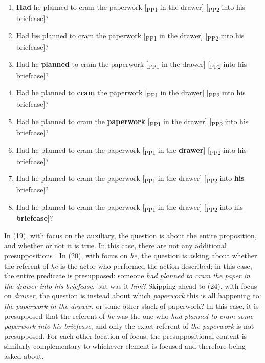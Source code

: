 \documentclass[12pt,oneside]{book}
\providecommand{\tightlist}{%
  \setlength{\itemsep}{0pt}\setlength{\parskip}{0pt}}
\begin{document}
\begin{enumerate}
\def\labelenumi{(\arabic{enumi})}
\setcounter{enumi}{18}
\tightlist
\item
  \textbf{Had} he planned to cram the paperwork {[}\textsubscript{PP1} in the drawer{]} {[}\textsubscript{PP2} into his briefcase{]}?
\item
  Had \textbf{he} planned to cram the paperwork {[}\textsubscript{PP1} in the drawer{]} {[}\textsubscript{PP2} into his briefcase{]}?
\item
  Had he \textbf{planned} to cram the paperwork {[}\textsubscript{PP1} in the drawer{]} {[}\textsubscript{PP2} into his briefcase{]}?
\item
  Had he planned to \textbf{cram} the paperwork {[}\textsubscript{PP1} in the drawer{]} {[}\textsubscript{PP2} into his briefcase{]}?
\item
  Had he planned to cram the \textbf{paperwork} {[}\textsubscript{PP1} in the drawer{]} {[}\textsubscript{PP2} into his briefcase{]}?
\item
  Had he planned to cram the paperwork {[}\textsubscript{PP1} in the \textbf{drawer}{]} {[}\textsubscript{PP2} into his briefcase{]}?
\item
  Had he planned to cram the paperwork {[}\textsubscript{PP1} in the drawer{]} {[}\textsubscript{PP2} into \textbf{his} briefcase{]}?
\item
  Had he planned to cram the paperwork {[}\textsubscript{PP1} in the drawer{]} {[}\textsubscript{PP2} into his \textbf{briefcase}{]}?
\end{enumerate}

In (19), with focus on the auxiliary, the question is about the entire proposition, and whether or not it is true. In this case, there are not any additional presuppositions . In (20), with focus on \emph{he}, the question is asking about whether the referent of \emph{he} is the actor who performed the action described; in this case, the entire predicate is presupposed: someone \emph{had planned to cram the paper in the drawer into his briefcase}, but was it \emph{him}? Skipping ahead to (24), with focus on \emph{drawer}, the question is instead about which \emph{paperwork} this is all happening to: \emph{the paperwork in the drawer}, or some other stack of paperwork? In this case, it is presupposed that the referent of \emph{he} was the one who \emph{had planned to cram some paperwork into his briefcase}, and only the exact referent of \emph{the paperwork} is not presupposed. For each other location of focus, the presuppositional content is similarly complementary to whichever element is focused and therefore being asked about.
\end{document}
